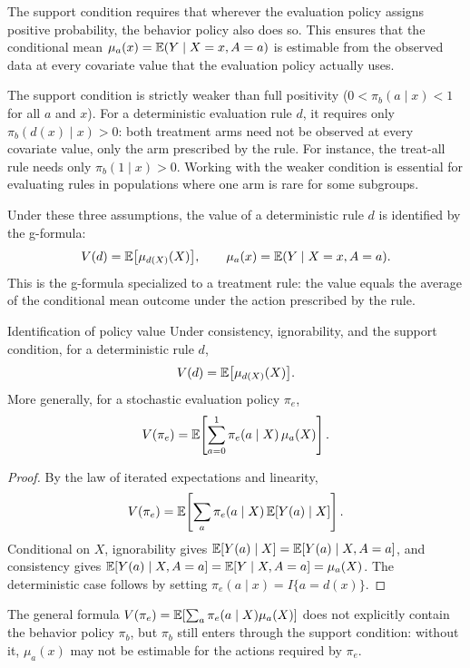 \documentclass[master.tex]{subfiles}
\begin{document}
The support condition requires that wherever the evaluation policy assigns positive probability, the behavior policy also does so.  This ensures that the conditional mean $\mu_a(x)=\mathbb{E}(Y\mid X=x,A=a)$ is estimable from the observed data at every covariate value that the evaluation policy actually uses.

\begin{remark}
\label{w13:rem:support}
The support condition is strictly weaker than full positivity ($0<\pi_b(a\mid x)<1$ for all $a$ and $x$).  For a deterministic evaluation rule $d$, it requires only $\pi_b(d(x)\mid x)>0$: both treatment arms need not be observed at every covariate value, only the arm prescribed by the rule.  For instance, the treat-all rule needs only $\pi_b(1\mid x)>0$.  Working with the weaker condition is essential for evaluating rules in populations where one arm is rare for some subgroups.
\end{remark}

Under these three assumptions, the value of a deterministic rule $d$ is identified by the g-formula:
\[
V(d)=\mathbb{E}\bigl[\mu_{d(X)}(X)\bigr], \qquad \mu_a(x)=\mathbb{E}(Y\mid X=x,A=a).
\]
This is the g-formula specialized to a treatment rule: the value equals the average of the conditional mean outcome under the action prescribed by the rule.

\begin{thm}{Identification of policy value}
\label{w13:thm:id}
Under consistency, ignorability, and the support condition, for a deterministic rule $d$,
\[
V(d)=\mathbb{E}\bigl[\mu_{d(X)}(X)\bigr].
\]
More generally, for a stochastic evaluation policy $\pi_e$,
\[
V(\pi_e)=\mathbb{E}\!\left[\sum_{a=0}^1\pi_e(a\mid X)\,\mu_a(X)\right].
\]
\end{thm}

\begin{proof}
By the law of iterated expectations and linearity,
\[
V(\pi_e)
=\mathbb{E}\!\left[\sum_a\pi_e(a\mid X)\,\mathbb{E}[Y(a)\mid X]\right].
\]
Conditional on $X$, ignorability gives $\mathbb{E}[Y(a)\mid X]=\mathbb{E}[Y(a)\mid X,A=a]$, and consistency gives $\mathbb{E}[Y(a)\mid X,A=a]=\mathbb{E}[Y\mid X,A=a]=\mu_a(X)$.  The deterministic case follows by setting $\pi_e(a\mid x)=I\{a=d(x)\}$.
\end{proof}

The general formula $V(\pi_e)=\mathbb{E}[\sum_a\pi_e(a\mid X)\mu_a(X)]$ does not explicitly contain the behavior policy $\pi_b$, but $\pi_b$ still enters through the support condition: without it, $\mu_a(x)$ may not be estimable for the actions required by $\pi_e$.
\end{document}
